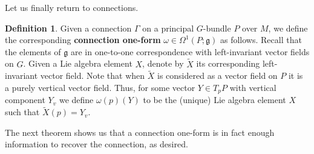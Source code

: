 \documentclass{book}
\newcommand{\fr}{\mathfrak}
\theoremstyle{plain}
\theoremstyle{definition}
\newtheorem{defn}{Definition}
\theoremstyle{remark}
\begin{document}
Let us finally return to connections.
\begin{defn}
    Given a connection $\Gamma$ on a principal $G$-bundle $P$ over $M$, we define the corresponding \textbf{connection one-form} $\omega\in \Omega^1(P;\fr g)$
    as follows. Recall that the elements of $\fr g$ are in one-to-one correspondence with left-invariant vector fields on $G$. Given a Lie algebra
    element $X$, denote by $\tilde X$ its corresponding left-invariant vector field. Note that when $\tilde X$ is considered
    as a vector field on $P$ it is a purely vertical vector field. Thus, for some vector $Y\in T_pP$ with vertical component $Y_v$ we define
    $\omega(p)(Y)$ to be the (unique) Lie algebra element $X$ such that $\tilde X(p)=Y_v$.
\end{defn}

The next theorem shows us that a connection one-form is in fact enough information to recover the connection, as desired.
\end{document}
